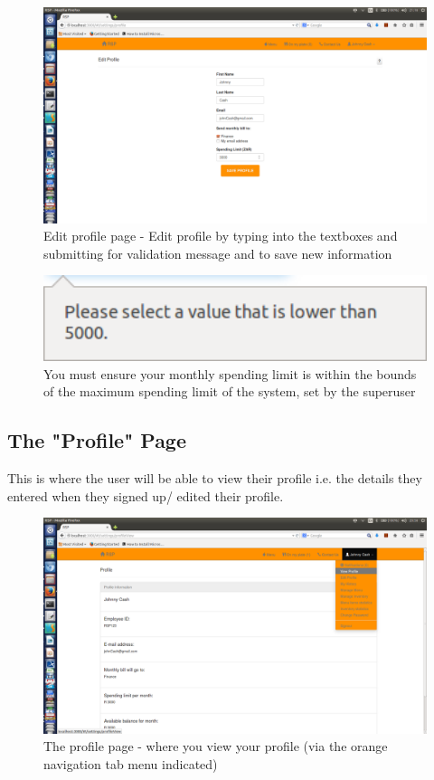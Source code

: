 \documentclass[a4paper,12pt]{article}
\begin{document}
\begin{figure}[H]
  \centering
    \includegraphics[width=1.0\textwidth]{screenshots/editProfile.png}
    \caption{Edit profile page - Edit profile by typing into the textboxes and submitting for validation message and to save new information } 
\end{figure}

\begin{figure}[H]
  \centering
    \includegraphics[width=1.0\textwidth]{screenshots/limitExeeds.png}
    \caption{You must ensure your monthly spending limit is within the bounds of the maximum spending limit of the system, set by the superuser} 
\end{figure}

\subsection{The "Profile" Page} 
This is where the user will be able to view their profile i.e. the details they entered when they signed up/ edited their profile. 

\begin{figure}[H]
  \centering
    \includegraphics[width=1.0\textwidth]{screenshots/viewProfile.png}
    \caption{The profile page - where you view your profile (via the orange navigation tab menu indicated)} 
\end{figure}
\end{document}
